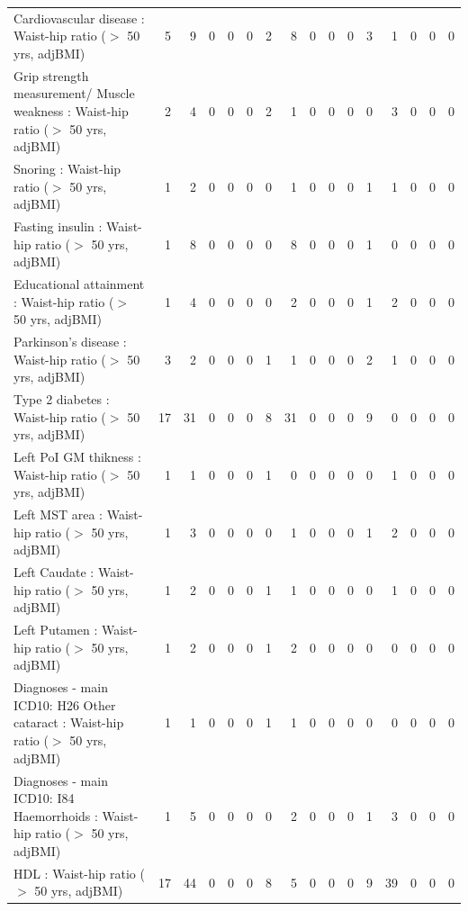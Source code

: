 \begin{table}[ht]
\begin{tabular}{lrrrrrrrrrrrrrrr}
  Cardiovascular disease : Waist-hip ratio ($>$ 50 yrs, adjBMI) &   5 &   9 &   0 &   0 &   0 &   2 &   8 &   0 &   0 &   0 &   3 &   1 &   0 &   0 &   0 \\ 
  Grip strength measurement/ Muscle weakness : Waist-hip ratio ($>$ 50 yrs, adjBMI) &   2 &   4 &   0 &   0 &   0 &   2 &   1 &   0 &   0 &   0 &   0 &   3 &   0 &   0 &   0 \\ 
  Snoring : Waist-hip ratio ($>$ 50 yrs, adjBMI) &   1 &   2 &   0 &   0 &   0 &   0 &   1 &   0 &   0 &   0 &   1 &   1 &   0 &   0 &   0 \\ 
  Fasting insulin : Waist-hip ratio ($>$ 50 yrs, adjBMI) &   1 &   8 &   0 &   0 &   0 &   0 &   8 &   0 &   0 &   0 &   1 &   0 &   0 &   0 &   0 \\ 
  Educational attainment : Waist-hip ratio ($>$ 50 yrs, adjBMI) &   1 &   4 &   0 &   0 &   0 &   0 &   2 &   0 &   0 &   0 &   1 &   2 &   0 &   0 &   0 \\ 
  Parkinson's disease : Waist-hip ratio ($>$ 50 yrs, adjBMI) &   3 &   2 &   0 &   0 &   0 &   1 &   1 &   0 &   0 &   0 &   2 &   1 &   0 &   0 &   0 \\ 
  Type 2 diabetes : Waist-hip ratio ($>$ 50 yrs, adjBMI) &  17 &  31 &   0 &   0 &   0 &   8 &  31 &   0 &   0 &   0 &   9 &   0 &   0 &   0 &   0 \\ 
  Left PoI GM thikness : Waist-hip ratio ($>$ 50 yrs, adjBMI) &   1 &   1 &   0 &   0 &   0 &   1 &   0 &   0 &   0 &   0 &   0 &   1 &   0 &   0 &   0 \\ 
  Left MST area : Waist-hip ratio ($>$ 50 yrs, adjBMI) &   1 &   3 &   0 &   0 &   0 &   0 &   1 &   0 &   0 &   0 &   1 &   2 &   0 &   0 &   0 \\ 
  Left Caudate : Waist-hip ratio ($>$ 50 yrs, adjBMI) &   1 &   2 &   0 &   0 &   0 &   1 &   1 &   0 &   0 &   0 &   0 &   1 &   0 &   0 &   0 \\ 
  Left Putamen : Waist-hip ratio ($>$ 50 yrs, adjBMI) &   1 &   2 &   0 &   0 &   0 &   1 &   2 &   0 &   0 &   0 &   0 &   0 &   0 &   0 &   0 \\ 
  Diagnoses - main ICD10: H26 Other cataract : Waist-hip ratio ($>$ 50 yrs, adjBMI) &   1 &   1 &   0 &   0 &   0 &   1 &   1 &   0 &   0 &   0 &   0 &   0 &   0 &   0 &   0 \\ 
  Diagnoses - main ICD10: I84 Haemorrhoids : Waist-hip ratio ($>$ 50 yrs, adjBMI) &   1 &   5 &   0 &   0 &   0 &   0 &   2 &   0 &   0 &   0 &   1 &   3 &   0 &   0 &   0 \\ 
  HDL : Waist-hip ratio ($>$ 50 yrs, adjBMI) &  17 &  44 &   0 &   0 &   0 &   8 &   5 &   0 &   0 &   0 &   9 &  39 &   0 &   0 &   0 \\ 

\end{tabular}
\end{table}
